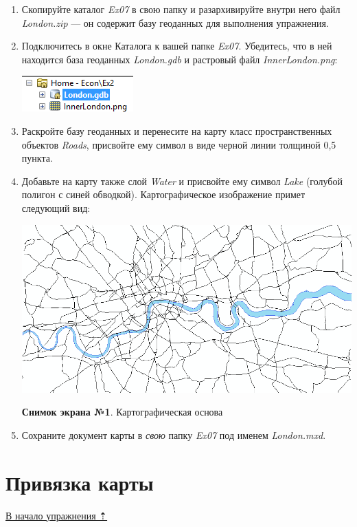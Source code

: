 \documentclass[]{book}
\theoremstyle{definition}
\theoremstyle{definition}
\theoremstyle{definition}
\theoremstyle{remark}
\begin{document}
\begin{enumerate}
\def\labelenumi{\arabic{enumi}.}
\item
  Скопируйте каталог \emph{Ex07} в свою папку и разархивируйте внутри
  него файл \emph{London.zip} --- он содержит базу геоданных для
  выполнения упражнения.
\item
  Подключитесь в окне Каталога к вашей папке \emph{Ex07}. Убедитесь, что
  в ней находится база геоданных \emph{London.gdb} и растровый файл
  \emph{InnerLondon.png}:

  \includegraphics{images/Ex07/image6.png}
\item
  Раскройте базу геоданных и перенесите на карту класс пространственных
  объектов \emph{Roads}, присвойте ему символ в виде черной линии
  толщиной 0,5 пункта.
\item
  Добавьте на карту также слой \emph{Water} и присвойте ему символ
  \emph{Lake} (голубой полигон с синей обводкой). Картографическое
  изображение примет следующий вид:

  \includegraphics{images/Ex07/image7.png}

  \textbf{Снимок экрана №1}. Картографическая основа
\item
  Сохраните документ карты в \emph{свою} папку \emph{Ex07} под именем
  \emph{London.mxd}.
\end{enumerate}

\hypertarget{map-ref-economic-referencing}{%
\section{Привязка карты}\label{map-ref-economic-referencing}}

\protect\hyperlink{map-ref-economic}{В начало упражнения ⇡}
\end{document}
